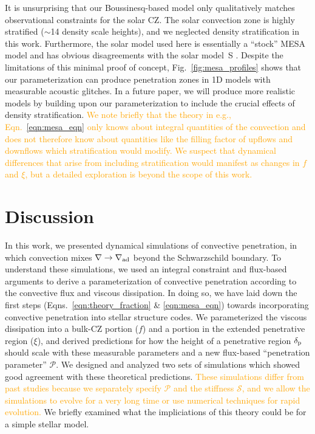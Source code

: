 \documentclass[twocolumn, linenumbers]{aastex631}
\newcommand{\gradad}{\ensuremath{\nabla_{\rm{ad}}}}
\newcommand{\justgrad}{\ensuremath{\nabla}}
\newcommand{\delp}{\ensuremath{\delta_{\rm{p}}}}
\newcommand{\mP}{\ensuremath{\mathcal{P}}}
\newcommand{\mS}{\ensuremath{\mathcal{S}}}
\newcommand{\editone}[1]{\textcolor{orange}{#1}}
\begin{document}
It is unsurprising that our Boussinesq-based model only qualitatively matches observational constraints for the solar CZ.
The solar convection zone is highly stratified ($\sim$14 density scale heights), and we neglected density stratification in this work.
Furthermore, the solar model used here is essentially a ``stock'' MESA model and has obvious disagreements with the solar model~S \citep[see Fig.~1 in][where the Schwarzschild base of the CZ is $r/R_\odot \approx 0.712$, whereas the one in Fig.~\ref{fig:mesa_profiles} is at $r/R_{\odot} \approx 0.75$]{christensen-dalsgaard_etal_2011}.
Despite the limitations of this minimal proof of concept, Fig.~\ref{fig:mesa_profiles} shows that our parameterization can produce penetration zones in 1D models with measurable acoustic glitches.
In a future paper, we will produce more realistic models by building upon our parameterization to include the crucial effects of density stratification.
\editone{
    We note briefly that the theory in e.g., Eqn.~\ref{eqn:mesa_eqn} only knows about integral quantities of the convection and does not therefore know about quantities like the filling factor of upflows and downflows which stratification would modify.
    We suspect that dynamical differences that arise from including stratification would manifest as changes in $f$ and $\xi$, but a detailed exploration is beyond the scope of this work.
}


\section{Discussion}
\label{sec:discussion}
In this work, we presented dynamical simulations of convective penetration, in which convection mixes ${\justgrad \rightarrow \gradad}$ beyond the Schwarzschild boundary.
To understand these simulations, we used an integral constraint \citep[reminiscent of][]{roxburgh1989} and flux-based arguments \citep[similar to][]{zahn1991} to derive a parameterization of convective penetration according to the convective flux and viscous dissipation.
In doing so, we have laid down the first steps (Eqns.~\ref{eqn:theory_fraction} \& \ref{eqn:mesa_eqn}) towards incorporating convective penetration into stellar structure codes.
We parameterized the viscous dissipation into a bulk-CZ portion ($f$) and a portion in the extended penetrative region ($\xi$), and derived predictions for how the height of a penetrative region $\delp$ should scale with these measurable parameters and a new flux-based ``penetration parameter'' $\mP$.
We designed and analyzed two sets of simulations which showed good agreement with these theoretical predictions.
\editone{
    These simulations differ from past studies because we separately specify $\mP$ and the stiffness $\mS$, and we allow the simulations to evolve for a very long time or use numerical techniques for rapid evolution.
}
We briefly examined what the impliciations of this theory could be for a simple stellar model.
\end{document}

